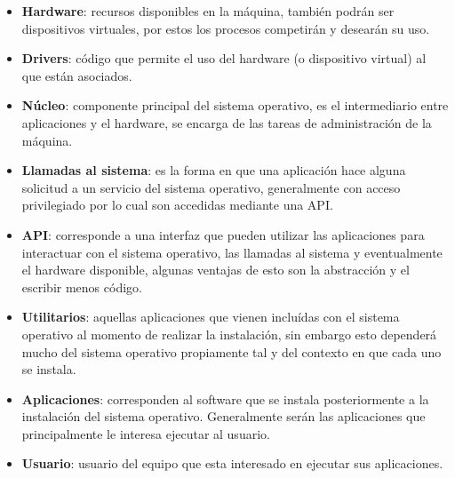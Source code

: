 \begin{itemize}

	\item \textbf{Hardware}: recursos disponibles en la máquina, también
	podrán ser dispositivos virtuales, por estos los procesos competirán y
	desearán su uso.

	\item \textbf{Drivers}: código que permite el uso del hardware (o
	dispositivo virtual) al que están asociados.

	\item \textbf{Núcleo}: componente principal del sistema operativo, es el
	intermediario entre aplicaciones y el hardware, se encarga de las tareas
	de administración de la máquina.

	\item \textbf{Llamadas al sistema}: es la forma en que una aplicación
	hace alguna solicitud a un servicio del sistema operativo, generalmente
	con acceso privilegiado por lo cual son accedidas mediante una API.

	\item \textbf{API}: corresponde a una interfaz que pueden utilizar las
	aplicaciones para interactuar con el sistema operativo, las llamadas al
	sistema y eventualmente el hardware disponible, algunas ventajas de esto
	son la abstracción y el escribir menos código.

	\item \textbf{Utilitarios}: aquellas aplicaciones que vienen incluídas
	con el sistema operativo al momento de realizar la instalación, sin
	embargo esto dependerá mucho del sistema operativo propiamente tal y del
	contexto en que cada uno se instala.

	\item \textbf{Aplicaciones}: corresponden al software que se instala
	posteriormente a la instalación del sistema operativo. Generalmente
	serán las aplicaciones que principalmente le interesa ejecutar al
	usuario.

	\item \textbf{Usuario}: usuario del equipo que esta interesado en
	ejecutar sus aplicaciones.

\end{itemize}

